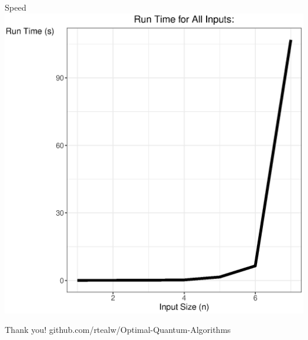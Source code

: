 \documentclass[12pt]{beamer}
\begin{document}
\begin{frame}{Speed}
    \includegraphics[scale=.5]{figures/figure_all_or_time.eps}
\end{frame}

\begin{frame}{Thank you!}
\centering
github.com/rtealw/Optimal-Quantum-Algorithms
\medskip


\end{frame}
\end{document}
